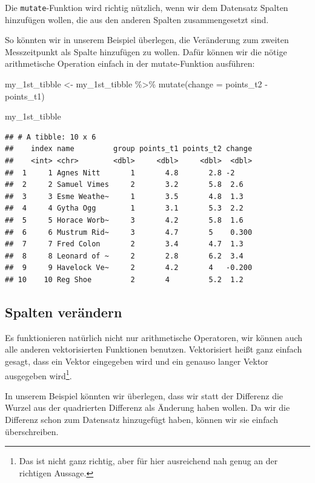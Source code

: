 \documentclass[
]{book}
\newenvironment{Shaded}{\begin{snugshade}}{\end{snugshade}}
\newcommand{\AttributeTok}[1]{\textcolor[rgb]{0.77,0.63,0.00}{#1}}
\newcommand{\FunctionTok}[1]{\textcolor[rgb]{0.00,0.00,0.00}{#1}}
\newcommand{\NormalTok}[1]{#1}
\newcommand{\OtherTok}[1]{\textcolor[rgb]{0.56,0.35,0.01}{#1}}
\newcommand{\SpecialCharTok}[1]{\textcolor[rgb]{0.00,0.00,0.00}{#1}}
\begin{document}
Die \texttt{mutate}-Funktion wird richtig nützlich, wenn wir dem Datensatz Spalten hinzufügen wollen, die aus den anderen Spalten zusammengesetzt sind.

So könnten wir in unserem Beispiel überlegen, die Veränderung zum zweiten Messzeitpunkt als Spalte hinzufügen zu wollen. Dafür können wir die nötige arithmetische Operation einfach in der mutate-Funktion ausführen:

\begin{Shaded}
\begin{Highlighting}[]
\NormalTok{my\_1st\_tibble }\OtherTok{\textless{}{-}}\NormalTok{ my\_1st\_tibble }\SpecialCharTok{\%\textgreater{}\%} 
  \FunctionTok{mutate}\NormalTok{(}\AttributeTok{change =}\NormalTok{ points\_t2 }\SpecialCharTok{{-}}\NormalTok{ points\_t1)}

\NormalTok{my\_1st\_tibble}
\end{Highlighting}
\end{Shaded}

\begin{verbatim}
## # A tibble: 10 x 6
##    index name         group points_t1 points_t2 change
##    <int> <chr>        <dbl>     <dbl>     <dbl>  <dbl>
##  1     1 Agnes Nitt       1       4.8       2.8 -2    
##  2     2 Samuel Vimes     2       3.2       5.8  2.6  
##  3     3 Esme Weathe~     1       3.5       4.8  1.3  
##  4     4 Gytha Ogg        1       3.1       5.3  2.2  
##  5     5 Horace Worb~     3       4.2       5.8  1.6  
##  6     6 Mustrum Rid~     3       4.7       5    0.300
##  7     7 Fred Colon       2       3.4       4.7  1.3  
##  8     8 Leonard of ~     2       2.8       6.2  3.4  
##  9     9 Havelock Ve~     2       4.2       4   -0.200
## 10    10 Reg Shoe         2       4         5.2  1.2
\end{verbatim}

\hypertarget{spalten-veruxe4ndern}{%
\subsection{Spalten verändern}\label{spalten-veruxe4ndern}}

Es funktionieren natürlich nicht nur arithmetische Operatoren, wir können auch alle anderen vektorisierten Funktionen benutzen. Vektorisiert heißt ganz einfach gesagt, dass ein Vektor eingegeben wird und ein genauso langer Vektor ausgegeben wird\footnote{Das ist nicht ganz richtig, aber für hier ausreichend nah genug an der richtigen Aussage.}.

In unserem Beispiel könnten wir überlegen, dass wir statt der Differenz die Wurzel aus der quadrierten Differenz als Änderung haben wollen. Da wir die Differenz schon zum Datensatz hinzugefügt haben, können wir sie einfach überschreiben.
\end{document}
